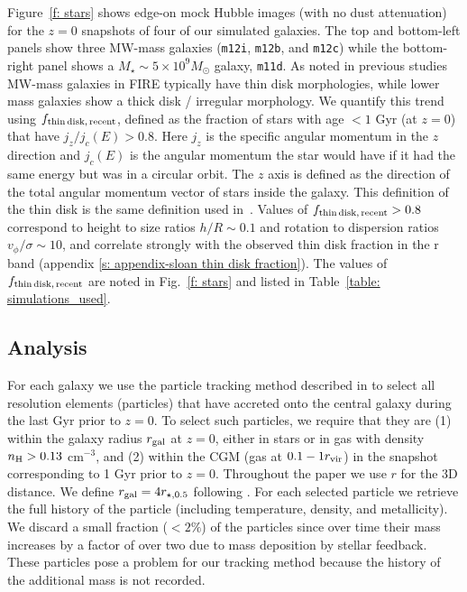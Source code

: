 \documentclass[fleqn,usenatbib]{mnras}
\newcommand{\Rvir}{r_{\rm vir}}
\begin{document}
Figure~\ref{f: stars} shows edge-on mock Hubble images (with no dust attenuation) for the $z=0$ snapshots of four of our simulated galaxies.
The top and bottom-left panels show three MW-mass galaxies (\texttt{m12i}, \texttt{m12b}, and \texttt{m12c}) while the bottom-right panel shows a $M_\star \sim 5 \times 10^9 M_\odot$ galaxy, \texttt{m11d}.
As noted in previous studies~\citep{Garrison-Kimmel2018, El-Badry2018} MW-mass galaxies in FIRE typically have thin disk morphologies, while lower mass galaxies show a thick disk / irregular morphology.
We quantify this trend using $f_{\rm thin\,disk,\,recent}$, defined as the fraction of stars with age $<1$ Gyr (at $z=0$) that have $j_z/j_c(E) > 0.8$.
Here $j_z$ is the specific angular momentum in the $z$ direction and $j_c(E)$ is the angular momentum the star would have if it had the same energy but was in a circular orbit.
The $z$ axis is defined as the direction of the total angular momentum vector of stars inside the galaxy.
This definition of the thin disk is the same definition used in~\cite{Yu2021}.
Values of $f_{\rm thin\,disk,\,recent}>0.8$ correspond to height to size ratios $h/R \sim 0.1$ and rotation to dispersion ratios $v_\phi/\sigma\sim10$, and correlate strongly with the observed thin disk fraction in the r band (appendix \ref{s: appendix-sloan thin disk fraction}).
The values of $f_{\rm thin\,disk,\,recent}$ are noted in Fig.~\ref{f: stars} and listed in Table~\ref{table: simulations_used}.

\subsection{Analysis}
\label{s: methods -- analysis}

For each galaxy we use the particle tracking method described in \cite{Hafen2019, Hafen2020} to select all resolution elements (particles) that have accreted onto the central galaxy during the last Gyr prior to $z=0$.
To select such particles, we require that they are
(1) within the galaxy radius $r_{\rm gal}$ at $z=0$, either in stars or in gas with density  $n_{\rm H} > 0.13$ cm$^{-3}$, and
(2) within the CGM (gas at $0.1 - 1 \Rvir$) in the snapshot corresponding to 1 Gyr prior to $z=0$.
Throughout the paper we use $r$ for the 3D distance. 
We define $r_{\rm gal} = 4 r_{\star,0.5}$ following \cite{Hafen2019, Hafen2020}.
For each selected particle we retrieve the full history of the particle (including temperature, density, and metallicity). 
We discard a small fraction ($<2\%$) of the particles since over time their mass increases by a factor of over two due to mass deposition by stellar feedback.
These particles pose a problem for our tracking method because the history of the additional mass is not recorded.
\end{document}
